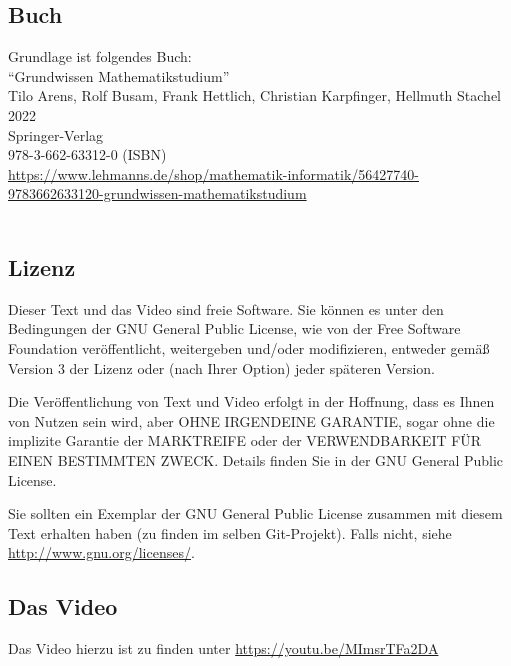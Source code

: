 \documentclass[a4paper]{amsart}
\theoremstyle{definition}
\begin{document}
\subsection*{Buch}
Grundlage ist folgendes Buch:\\
"`Grundwissen Mathematikstudium"'\\
Tilo Arens, Rolf Busam, Frank Hettlich, Christian Karpfinger, Hellmuth Stachel \\
2022\\
Springer-Verlag\\
978-3-662-63312-0 (ISBN)\\
{\tiny
   \url{https://www.lehmanns.de/shop/mathematik-informatik/56427740-9783662633120-grundwissen-mathematikstudium}}\\
\\

\subsection*{Lizenz}
Dieser Text und das Video sind freie Software. Sie können es unter den Bedingungen der 
GNU General Public License, wie von der Free Software Foundation veröffentlicht, weitergeben 
und/oder modifizieren, entweder gemäß Version 3 der Lizenz oder (nach Ihrer Option) jeder späteren Version.

Die Veröffentlichung von Text und Video erfolgt in der Hoffnung, dass es Ihnen von Nutzen sein wird, 
aber OHNE IRGENDEINE GARANTIE, sogar ohne die implizite Garantie der MARKTREIFE oder der 
VERWENDBARKEIT FÜR EINEN BESTIMMTEN ZWECK. Details finden Sie in der GNU General Public License.

Sie sollten ein Exemplar der GNU General Public License zusammen mit diesem Text erhalten haben 
(zu finden im selben Git-Projekt). 
Falls nicht, siehe \url{http://www.gnu.org/licenses/}.

\subsection*{Das Video}
Das Video hierzu ist zu finden unter 
{\tiny
   \url{https://youtu.be/MImsrTFa2DA}
}
\end{document}
